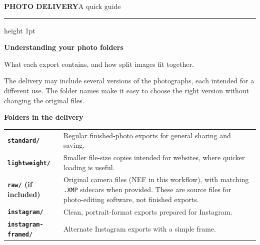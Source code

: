 \documentclass[10pt]{article}
\begin{document}
\color{ink}

{\large\bfseries\color{accent}PHOTO DELIVERY}\hfill{\small\color{muted}A quick guide}
\vspace{5pt}
\hrule height 1pt
\vspace{12pt}

{\LARGE\bfseries Understanding your photo folders}\par
\vspace{3pt}
{\large\color{muted}What each export contains, and how split images fit together.}

\vspace{12pt}
The delivery may include several versions of the photographs, each intended for a different use. The folder names make it easy to choose the right version without changing the original files.

\vspace{5pt}
{\large\bfseries Folders in the delivery}\par
\begin{tabularx}{\textwidth}{>{\bfseries\color{accent}}p{} X}
\rowcolor{mist}\texttt{standard/} & Regular finished-photo exports for general sharing and saving.\\
\texttt{lightweight/} & Smaller file-size copies intended for websites, where quicker loading is useful.\\
\texttt{raw/} (if included) & Original camera files (NEF in this workflow), with matching \texttt{.XMP} sidecars when provided. These are source files for photo-editing software, not finished exports.\\
\texttt{instagram/} & Clean, portrait-format exports prepared for Instagram.\\
\texttt{instagram-framed/} & Alternate Instagram exports with a simple frame.\\
\end{tabularx}
\end{document}
